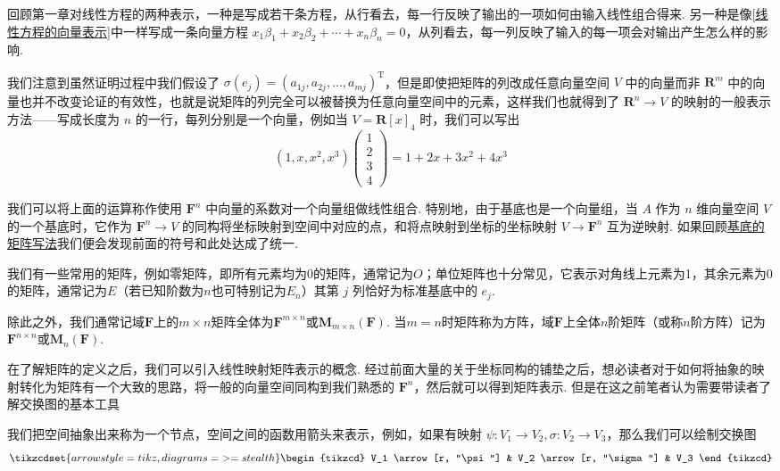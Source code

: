 回顾第一章对线性方程的两种表示，一种是写成若干条方程，从行看去，每一行反映了输出的一项如何由输入线性组合得来. 另一种是像\autoref{线性方程的向量表示}中一样写成一条向量方程 $x_1\beta_1 + x_2\beta_2 + \cdots + x_n\beta_n = 0$，从列看去，每一列反映了输入的每一项会对输出产生怎么样的影响.

我们注意到虽然证明过程中我们假设了 $\sigma(e_j) = (a_{1j}, a_{2j}, \ldots, a_{mj})^{\mathrm{T}}$，但是即使把矩阵的列改成任意向量空间 $V$ 中的向量而非 $\mathbf{R}^m$ 中的向量也并不改变论证的有效性，也就是说矩阵的列完全可以被替换为任意向量空间中的元素，这样我们也就得到了 $\mathbf{R}^n \to V$ 的映射的一般表示方法——写成长度为 $n$ 的一行，每列分别是一个向量，例如当 $V = \mathbf{R}[x]_4$ 时，我们可以写出
\[
(1, x, x^2, x^3) \begin{pmatrix}
    1 \\ 2 \\ 3 \\ 4
\end{pmatrix} = 1 + 2x + 3x^2 + 4x^3
\]

我们可以将上面的运算称作使用 $\mathbf{F}^n$ 中向量的系数对一个向量组做线性组合. 特别地，由于基底也是一个向量组，当 $A$ 作为 $n$ 维向量空间 $V$ 的一个基底时，它作为 $\mathbf{F}^n\to V$ 的同构将坐标映射到空间中对应的点，和将点映射到坐标的坐标映射 $V\to\mathbf{F}^n$ 互为逆映射. 如果回顾\hyperlink{基底的矩阵写法}{基底的矩阵写法}我们便会发现前面的符号和此处达成了统一.

我们有一些常用的矩阵，例如零矩阵，即所有元素均为0的矩阵，通常记为$O$；单位矩阵也十分常见，它表示对角线上元素为1，其余元素为0的矩阵，通常记为$E$（若已知阶数为$n$也可特别记为$E_n$）其第 $j$ 列恰好为标准基底中的 $e_j$.

除此之外，我们通常记域$\mathbf{F}$上的$m\times n$矩阵全体为$\mathbf{F}^{m\times n}$或$\mathbf{M}_{m\times n}(\mathbf{F})$. 当$m=n$时矩阵称为方阵，域$\mathbf{F}$上全体$n$阶矩阵（或称$n$阶方阵）记为$\mathbf{F}^{n\times n}$或$\mathbf{M}_n(\mathbf{F})$.

在了解矩阵的定义之后，我们可以引入线性映射矩阵表示的概念. 经过前面大量的关于坐标同构的铺垫之后，想必读者对于如何将抽象的映射转化为矩阵有一个大致的思路，将一般的向量空间同构到我们熟悉的 $\mathbf{F}^n$，然后就可以得到矩阵表示. 但是在这之前笔者认为需要带读者了解交换图的基本工具

我们把空间抽象出来称为一个节点，空间之间的函数用箭头来表示，例如，如果有映射 $\psi\colon V_1 \to V_2, \sigma\colon V_2 \to V_3$，那么我们可以绘制交换图
\[
    \tikzcdset{arrow style=tikz, diagrams={>=stealth}}
    \begin{tikzcd}
        V_1 \arrow[r, "\psi"] & V_2 \arrow[r, "\sigma"] & V_3
    \end{tikzcd}
\]

